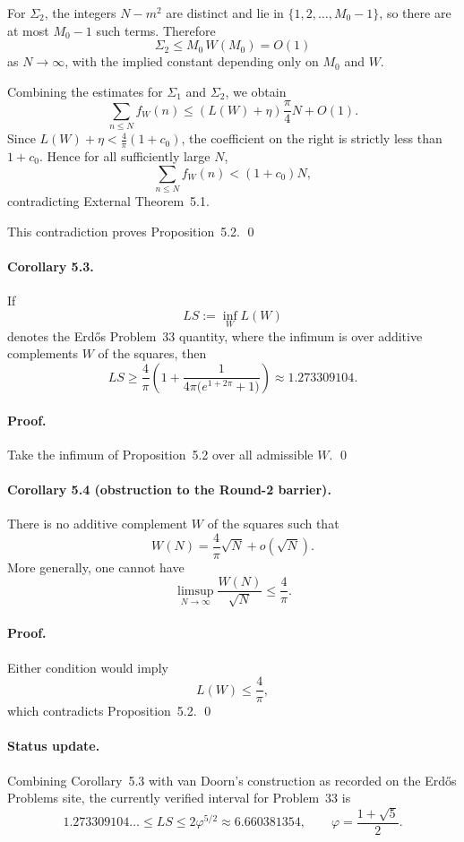 For \(\Sigma_2\), the integers \(N-m^2\) are distinct and lie in \(\{1,2,\dots,M_0-1\}\), so there are at most \(M_0-1\) such terms. Therefore
\[
\Sigma_2\le M_0\,W(M_0)=O(1)
\]
as \(N\to\infty\), with the implied constant depending only on \(M_0\) and \(W\).

Combining the estimates for \(\Sigma_1\) and \(\Sigma_2\), we obtain
\[
\sum_{n\le N} f_W(n)
\le (L(W)+\eta)\frac{\pi}{4}N+O(1).
\]
Since \(L(W)+\eta<\frac{4}{\pi}(1+c_0)\), the coefficient on the right is strictly less than \(1+c_0\). Hence for all sufficiently large \(N\),
\[
\sum_{n\le N} f_W(n)<(1+c_0)N,
\]
contradicting External Theorem~5.1.

This contradiction proves Proposition~5.2. \qed

\paragraph{Corollary 5.3.}
If
\[
LS:=\inf_W L(W)
\]
denotes the Erd\H{o}s Problem~33 quantity, where the infimum is over additive complements \(W\) of the squares, then
\[
LS\ge \frac{4}{\pi}\left(1+\frac{1}{4\pi\bigl(e^{1+2\pi}+1\bigr)}\right)
\approx 1.273309104.
\]

\paragraph{Proof.}
Take the infimum of Proposition~5.2 over all admissible \(W\). \qed

\paragraph{Corollary 5.4 (obstruction to the Round-2 barrier).}
There is no additive complement \(W\) of the squares such that
\[
W(N)=\frac{4}{\pi}\sqrt N+o(\sqrt N).
\]
More generally, one cannot have
\[
\limsup_{N\to\infty}\frac{W(N)}{\sqrt N}\le \frac{4}{\pi}.
\]

\paragraph{Proof.}
Either condition would imply
\[
L(W)\le \frac{4}{\pi},
\]
which contradicts Proposition~5.2. \qed

\paragraph{Status update.}
Combining Corollary~5.3 with van Doorn's construction as recorded on the Erd\H{o}s Problems site, the currently verified interval for Problem~33 is
\[
1.273309104\ldots
\le LS
\le 2\varphi^{5/2}
\approx 6.660381354,
\qquad \varphi=\frac{1+\sqrt5}{2}.
\]

